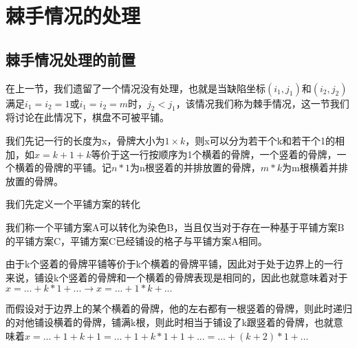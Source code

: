 \chapter{棘手情况的处理}


\section{棘手情况处理的前置}
在上一节，我们遗留了一个情况没有处理，也就是当缺陷坐标$(i_1, j_1)$和$(i_2, j_2)$满足$i_1 = i_2 = 1$或$i_1 = i_2 = m$时，$j_2 < j_1$，该情况我们称为棘手情况，这一节我们将讨论在此情况下，棋盘不可被平铺。

我们先记一行的长度为x，骨牌大小为$1 \times k$，则x可以分为若干个k和若干个1的相加，如$x = k + 1 + k$等价于这一行按顺序为1个横着的骨牌，一个竖着的骨牌，一个横着的骨牌的平铺。记$n * 1$为n根竖着的并排放置的骨牌，$m * k$为m根横着并排放置的骨牌。

我们先定义一个平铺方案的转化
\begin{definition}
    我们称一个平铺方案A可以转化为染色B，当且仅当对于存在一种基于平铺方案B的平铺方案C，平铺方案C已经铺设的格子与平铺方案A相同。
\end{definition}

由于k个竖着的骨牌平铺等价于k个横着的骨牌平铺，因此对于处于边界上的一行来说，铺设k个竖着的骨牌和一个横着的骨牌表现是相同的，因此也就意味着对于$x =... + k * 1 + ... \rightarrow x = ... + 1 * k + ...$

而假设对于边界上的某个横着的骨牌，他的左右都有一根竖着的骨牌，则此时递归的对他铺设横着的骨牌，铺满k根，则此时相当于铺设了k跟竖着的骨牌，也就意味着$x = ... + 1 + k + 1 = ... + 1 + k * 1 + 1 + ...= ... + (k + 2) * 1 + ...$

